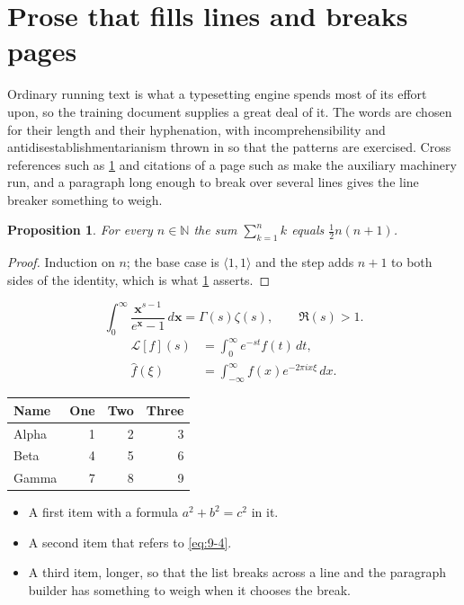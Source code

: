\documentclass[11pt,a4paper]{report}
\theoremstyle{plain}
\newtheorem{proposition}{Proposition}[chapter]
\newcommand{\vecn}[1]{\mathbf{#1}}
\newcommand{\pairs}[2]{\langle #1,#2\rangle}
\begin{document}
\section{Prose that fills lines and breaks pages}
\label{sec:prose9-4}
Ordinary running text is what a typesetting engine spends most of its effort
upon, so the training document supplies a great deal of it. The words are
chosen for their length and their hyphenation, with incomprehensibility and
antidisestablishmentarianism thrown in so that the patterns are exercised.
Cross references such as \cref{sec:prose9-4} and citations of a page such
as \pageref{sec:prose9-4} make the auxiliary machinery run, and a
paragraph long enough to break over several lines gives the line breaker
something to weigh.
\begin{proposition}\label{prop:9-4}
For every $n\in\mathbb{N}$ the sum $\sum_{k=1}^{n}k$ equals
$\tfrac{1}{2}n(n+1)$.
\end{proposition}
\begin{proof}
Induction on $n$; the base case is $\pairs{1}{1}$ and the step adds $n+1$ to
both sides of the identity, which is what \cref{prop:9-4} asserts.
\end{proof}
\begin{equation}\label{eq:9-4}
  \int_{0}^{\infty}\frac{\vecn{x}^{s-1}}{e^{\vecn{x}}-1}\,d\vecn{x}
    = \Gamma(s)\zeta(s),\qquad \Re(s)>1 .
\end{equation}
\begin{align}
  \mathcal{L}[f](s) &= \int_{0}^{\infty} e^{-st} f(t)\,dt, \\
  \widehat{f}(\xi)  &= \int_{-\infty}^{\infty} f(x) e^{-2\pi i x\xi}\,dx .
\end{align}
\par\noindent\begin{center}
\begin{tabular}{lrrr}
\hline
Name & One & Two & Three \\
\hline
Alpha & 1 & 2 & 3 \\
Beta & 4 & 5 & 6 \\
Gamma & 7 & 8 & 9 \\
\hline
\end{tabular}
\end{center}
\begin{itemize}
  \item A first item with a formula $a^2+b^2=c^2$ in it.
  \item A second item that refers to \eqref{eq:9-4}.
  \item A third item, longer, so that the list breaks across a line and the
    paragraph builder has something to weigh when it chooses the break.
\end{itemize}
\end{document}
